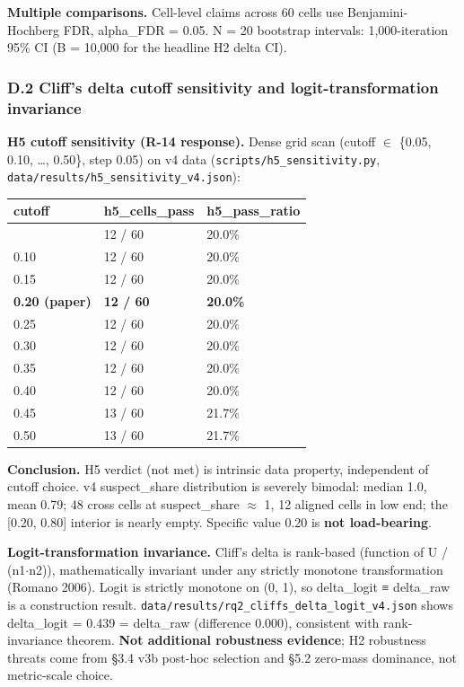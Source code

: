 \documentclass[review,12pt,authoryear]{elsarticle}
\newcounter{none}                   %
\begin{document}
\textbf{Multiple comparisons.} Cell-level claims across 60 cells use
Benjamini-Hochberg FDR, alpha\_FDR = 0.05. N = 20 bootstrap intervals:
1,000-iteration 95\% CI (B = 10,000 for the headline H2 delta CI).

\subsubsection{D.2 Cliff's delta cutoff sensitivity and
logit-transformation
invariance}\label{d.2-cliffs-delta-cutoff-sensitivity-and-logit-transformation-invariance}

\textbf{H5 cutoff sensitivity (R-14 response).} Dense grid scan (cutoff
$\in$ \{0.05, 0.10, \ldots, 0.50\}, step 0.05) on v4 data
(\texttt{scripts/h5\_sensitivity.py},
\texttt{data/results/h5\_sensitivity\_v4.json}):

{\def\LTcaptype{none} %
\begin{longtable}[]{@{}lll@{}}
\toprule\noalign{}
cutoff & h5\_cells\_pass & h5\_pass\_ratio \\
\midrule\noalign{}
\endhead
\bottomrule\noalign{}
\endlastfoot
0.05 & 12 / 60 & 20.0\% \\
0.10 & 12 / 60 & 20.0\% \\
0.15 & 12 / 60 & 20.0\% \\
\textbf{0.20 (paper)} & \textbf{12 / 60} & \textbf{20.0\%} \\
0.25 & 12 / 60 & 20.0\% \\
0.30 & 12 / 60 & 20.0\% \\
0.35 & 12 / 60 & 20.0\% \\
0.40 & 12 / 60 & 20.0\% \\
0.45 & 13 / 60 & 21.7\% \\
0.50 & 13 / 60 & 21.7\% \\
\end{longtable}
}

\textbf{Conclusion.} H5 verdict (not met) is intrinsic data property,
independent of cutoff choice. v4 suspect\_share distribution is severely
bimodal: median 1.0, mean 0.79; 48 cross cells at suspect\_share $\approx$ 1, 12
aligned cells in low end; the {[}0.20, 0.80{]} interior is nearly empty.
Specific value 0.20 is \textbf{not load-bearing}.

\textbf{Logit-transformation invariance.} Cliff's delta is rank-based
(function of U / (n1$\cdot$n2)), mathematically invariant under any strictly
monotone transformation (Romano 2006). Logit is strictly monotone on (0,
1), so delta\_logit ≡ delta\_raw is a construction result.
\texttt{data/results/rq2\_cliffs\_delta\_logit\_v4.json} shows
delta\_logit = 0.439 = delta\_raw (difference 0.000), consistent with
rank-invariance theorem. \textbf{Not additional robustness evidence}; H2
robustness threats come from §3.4 v3b post-hoc selection and §5.2
zero-mass dominance, not metric-scale choice.
\end{document}
